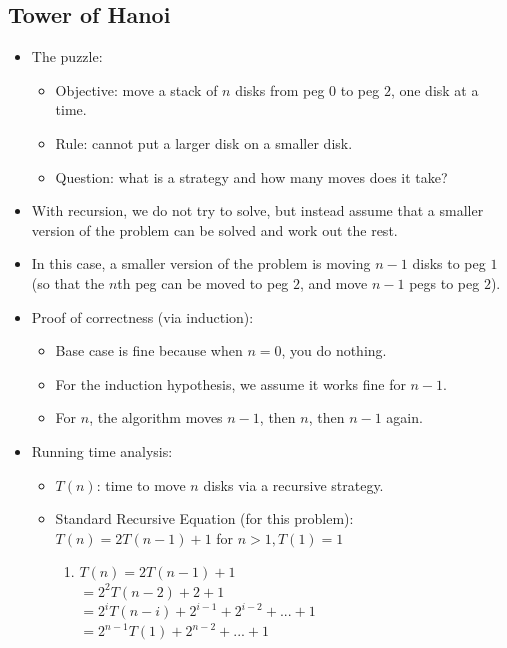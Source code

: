 \documentclass[12pt]{article}
\begin{document}
\subsection{Tower of Hanoi}
\begin{itemize}
    \item The puzzle:
    \begin{itemize}
        \item Objective: move a stack of $n$ disks from peg $0$ to peg $2$, one disk at a time.
        \item Rule: cannot put a larger disk on a smaller disk.
        \item Question: what is a strategy and how many moves does it take?
    \end{itemize}
    \item With recursion, we do not try to solve, but instead assume that a smaller version of the problem can be solved and work out the rest.
    \item In this case, a smaller version of the problem is moving $n-1$ disks to peg $1$ (so that the $n$th peg can be moved to peg $2$, and move $n-1$ pegs to peg $2$).
    
    \item Proof of correctness (via induction):
    \begin{itemize}
        \item Base case is fine because when $n = 0$, you do nothing.
        \item For the induction hypothesis, we assume it works fine for $n - 1$.
        \item For $n$, the algorithm moves $n - 1$, then $n$, then $n - 1$ again.
    \end{itemize}
    \item Running time analysis:
    \begin{itemize}
        \item $T(n)$: time to move $n$ disks via a recursive strategy.
        \item Standard Recursive Equation (for this problem): $T(n) = 2T(n - 1) + 1$ for $n > 1, T(1) = 1$
        \begin{enumerate}
            \item
                $T(n) = 2T(n - 1) + 1$ \\
                $= 2^2 T(n - 2) + 2 + 1$ \\
                $= 2^i T(n - i) + 2^{i-1} + 2^{i-2} + ... + 1$ \\
                $= 2^{n-1} T(1) + 2^{n-2} + ... + 1$ \\

\end{enumerate}
\end{itemize}
\end{itemize}
\end{document}
